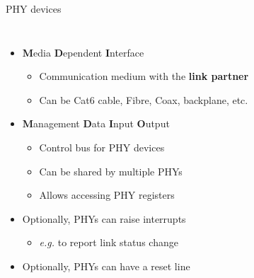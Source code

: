 \begin{frame}{PHY devices}
\begin{columns}
\begin{itemize}
			\item \textbf{M}edia \textbf{D}ependent \textbf{I}nterface
				\begin{itemize}
					\item Communication medium with the \textbf{link partner}
					\item Can be Cat6 cable, Fibre, Coax, backplane, etc.
				\end{itemize}
			\item \textbf{M}anagement \textbf{D}ata \textbf{I}nput \textbf{O}utput
				\begin{itemize}
					\item Control bus for PHY devices
					\item Can be shared by multiple PHYs
					\item Allows accessing PHY registers
				\end{itemize}
			\item Optionally, PHYs can raise interrupts
				\begin{itemize}
					\item \textit{e.g.} to report link status change
				\end{itemize}
			\item Optionally, PHYs can have a reset line


		\end{itemize}
	\end{columns}
\end{frame}


